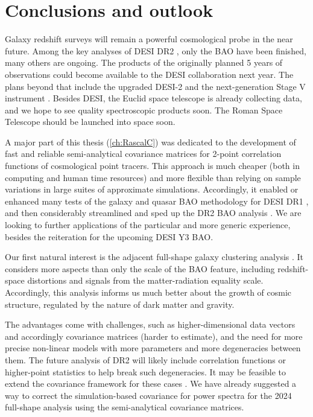 \chapter{Conclusions and outlook}
\label{ch:conclusion}

Galaxy redshift surveys will remain a powerful cosmological probe in the near future.
Among the key analyses of DESI DR2 \citep{DESI.DR2.DR2}, only the BAO \citep{DESI.DR2.BAO.lya,DESI.DR2.BAO.cosmo} have been finished, many others are ongoing.
The products of the originally planned 5 years of observations could become available to the DESI collaboration next year.
The plans beyond that include the upgraded DESI-2 and the next-generation Stage V instrument \citep{spectroscopic-roadmap-cosmic-frontier}.
Besides DESI, the Euclid space telescope \citep{Euclid-overview} is already collecting data, and we hope to see quality spectroscopic products soon.
The Roman Space Telescope \citep[also known as the Wide-Field Infrared Survey Telescope and the Joint Dark Energy Mission][]{WFIRST-2019} should be launched into space soon.

A major part of this thesis (\cref{ch:RascalC}) was dedicated to the development of fast and reliable semi-analytical covariance matrices for 2-point correlation functions of cosmological point tracers.
This approach is much cheaper (both in computing and human time resources) and more flexible than relying on sample variations in large suites of approximate simulations.
Accordingly, it enabled or enhanced many tests of the galaxy and quasar BAO methodology for DESI DR1 \citep{DESI2024.III.KP4}, and then considerably streamlined and sped up the DR2 BAO analysis \citep{Y3.clust-s1.Andrade.2025,DESI.DR2.BAO.cosmo}.
We are looking to further applications of the particular and more generic experience, besides the reiteration for the upcoming DESI Y3 BAO.

Our first natural interest is the adjacent full-shape galaxy clustering analysis \citep[e.g,][]{DESI2024.V.KP5}.
It considers more aspects than only the scale of the BAO feature, including redshift-space distortions and signals from the matter-radiation equality scale.
Accordingly, this analysis informs us much better about the growth of cosmic structure, regulated by the nature of dark matter and gravity.

The advantages come with challenges, such as higher-dimensional data vectors and accordingly covariance matrices (harder to estimate), and the need for more precise non-linear models with more parameters and more degeneracies between them.
The future analysis of DR2 will likely include correlation functions or higher-point statistics to help break such degeneracies.
It may be feasible to extend the covariance framework for these cases \citep[similarly to][]{rascalC-legendre-3}.
We have already suggested a way to correct the simulation-based covariance for power spectra for the 2024 full-shape analysis \citep{DESI2024.V.KP5,DESI2024.II.KP3} using the \rascalc{} semi-analytical covariance matrices.

